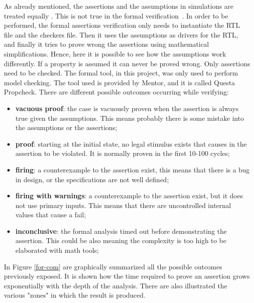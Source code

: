 As already mentioned, the assertions and the assumptions in simulations are treated equally . This is not true in the formal verification~\cite{verification-book-2018-formal}.
In order to be performed, the formal assertions verification only needs to instantiate the RTL file and the checkers file. Then it uses the assumptions as drivers for the RTL, and finally it tries to prove wrong the assertions using mathematical simplifications.
Hence, here it is possible to see how the assumptions work differently. If a property is assumed it can never be proved wrong. Only assertions need to be checked.
The formal tool, in this project, was only used to perform model checking.
The tool used is provided by Mentor, and it is called Questa Propcheck.
There are different possible outcomes occurring while verifying:
\begin{itemize}
    \item \textbf{vacuous proof}: the case is vacuously proven when the assertion is always true given the assumptions. This means probably there is some mistake into the assumptions or the assertions;
    
    \item \textbf{proof}: starting at the initial state, no legal stimulus exists that causes in the assertion to be violated. It is normally proven in the first 10-100 cycles;
    
    \item \textbf{firing}: a counterexample to the assertion exist, this means that there is a bug in design, or the specifications are not well defined;
    
    \item \textbf{firing with warnings}: a counterexample to the assertion exist, but it does not use primary inputs. This means that there are uncontrolled internal values that cause a fail;
    
    \item \textbf{inconclusive}: the formal analysis timed out before demonstrating the assertion. This could be also meaning the complexity is too high to be elaborated with math tools; 
    
\end{itemize}

In Figure \ref{for-com} are graphically summarized all the possible outcomes previously exposed.
It is shown how the time required to prove an assertion grows exponentially with the depth of the analysis.
There are also illustrated the various "zones" in which the result is produced.


